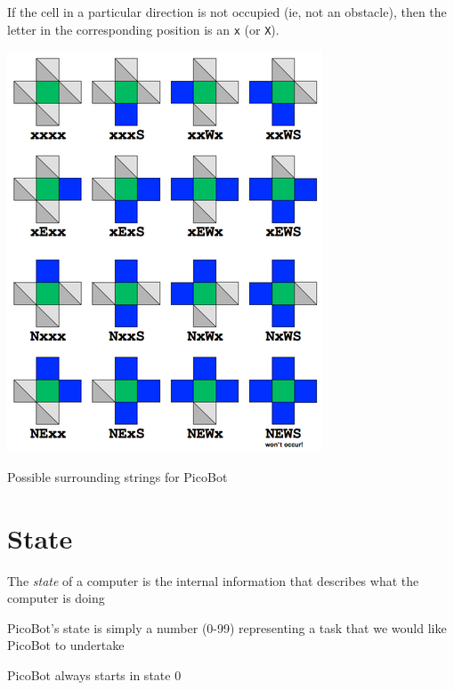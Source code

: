 \documentclass[8pt,a4paper,compress]{beamer}
\begin{document}
\begin{frame}[fragile]
\begin{minipage}{200pt}
\pause
\bigskip

If the cell in a particular direction is not occupied (ie, not an obstacle), then the letter in the corresponding position is an \lstinline{x} (or \lstinline{X}). 
\end{minipage}\hfill%
\begin{minipage}{100pt}
\begin{center}
\includegraphics[scale=0.25]{figures/picobot_surroundings.png}

\smallskip

\tiny Possible surrounding strings for PicoBot
\end{center}
\end{minipage}
\end{frame}

\section{State}
\begin{frame}[fragile]
\pause
The \emph{state} of a computer is the internal information that describes what the computer is doing

\pause
\bigskip

PicoBot's state is simply a number (0-99) representing a task that we would like PicoBot to undertake

\pause
\bigskip

PicoBot always starts in state 0
\end{frame}
\end{document}
